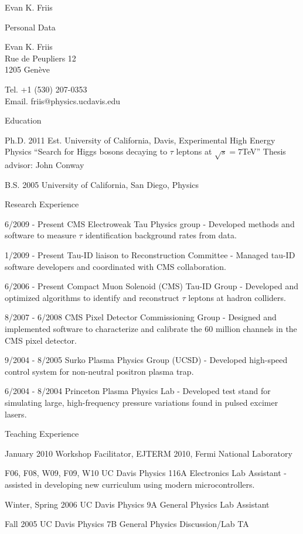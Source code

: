 \documentclass[12pt]{amsart}
\title{}
\author{}
\date{} %
\begin{document}
\nobibliography*
\begin{cv}{Evan K. Friis}

\begin{cvlist}{Personal Data}
\item Evan K. Friis\\
Rue de Peupliers 12\\
1205 Gen\`{e}ve\\

\item Tel. +1 (530) 207-0353\\
Email. friis@physics.ucdavis.edu
\end{cvlist}

\begin{cvlist}{Education}
\item[Ph.D. 2011 Est.] University of California, Davis, Experimental High Energy Physics 
   ``Search for Higgs bosons decaying to $\tau$ leptons at $\sqrt s = 7$TeV'' Thesis advisor: John Conway
\item[B.S. 2005] University of California, San Diego, Physics
\end{cvlist}

\begin{cvlist}{Research Experience}
\item[6/2009 - Present] CMS Electroweak Tau Physics group - Developed methods and software to measure $\tau$ identification background rates from data.
\item[1/2009 - Present] Tau-ID liaison to Reconstruction Committee - Managed tau-ID software developers and coordinated with CMS collaboration.
\item[6/2006 - Present] Compact Muon Solenoid (CMS) Tau-ID Group - Developed and optimized algorithms to identify and reconstruct $\tau$ leptons at hadron colliders.
\item[8/2007 - 6/2008] CMS Pixel Detector Commissioning Group - Designed and implemented software to characterize and calibrate the 60 million channels in the CMS pixel detector.
\item[9/2004 - 8/2005] Surko Plasma Physics Group (UCSD) - Developed high-speed control system for non-neutral positron plasma trap.
\item[6/2004 - 8/2004] Princeton Plasma Physics Lab - Developed test stand for simulating large, high-frequency pressure variations found in pulsed excimer lasers.
\end{cvlist}

\begin{cvlist}{Teaching Experience}
\item[January 2010] Workshop Facilitator, EJTERM 2010, Fermi National Laboratory
\item[F06, F08, W09, F09, W10] UC Davis Physics 116A Electronics Lab Assistant -
   assisted in developing new curriculum using modern microcontrollers.
\item[Winter, Spring 2006] UC Davis Physics 9A General Physics Lab Assistant
\item[Fall 2005] UC Davis Physics 7B General Physics Discussion/Lab TA
\end{cvlist}


\end{cv}
\end{document}
